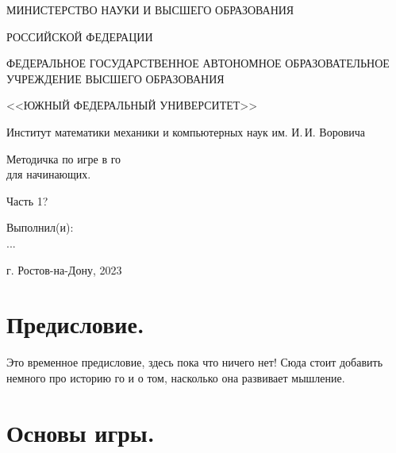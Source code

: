\documentclass[14pt,a4paper]{extarticle}
\begin{document}
\thispagestyle{empty}
\begin{center}
\small{МИНИСТЕРСТВО НАУКИ И ВЫСШЕГО ОБРАЗОВАНИЯ}\par
\small{РОССИЙСКОЙ ФЕДЕРАЦИИ}\par
\small{ФЕДЕРАЛЬНОЕ ГОСУДАРСТВЕННОЕ АВТОНОМНОЕ ОБРАЗОВАТЕЛЬНОЕ УЧРЕЖДЕНИЕ ВЫСШЕГО ОБРАЗОВАНИЯ}\par
\small{<<ЮЖНЫЙ ФЕДЕРАЛЬНЫЙ УНИВЕРСИТЕТ>>}\par
\normalsize{Институт математики механики и компьютерных наук им. И.\,И. Воровича}\par
\end{center}


\vspace*{5.0em plus 0.2em minus 0.2em}

\begin{center}
Методичка по игре в го\\
для начинающих.
\end{center}

\begin{center}
Часть 1?
\end{center}

\vspace*{5.0em plus 0.2em minus 0.2em}
\begin{flushright}
 Выполнил(и):\\
	...
\end{flushright}


\vspace*{\fill}

\begin{center}
г. Ростов-на-Дону, 2023
\end{center}


\newpage

\thispagestyle{empty}
\tableofcontents


\newpage


\section*{Предисловие.}

Это временное предисловие, здесь пока что ничего нет! Сюда стоит
добавить немного про историю го и о том, насколько она
развивает мышление.

\newpage


\section*{Основы игры.}
\end{document}
